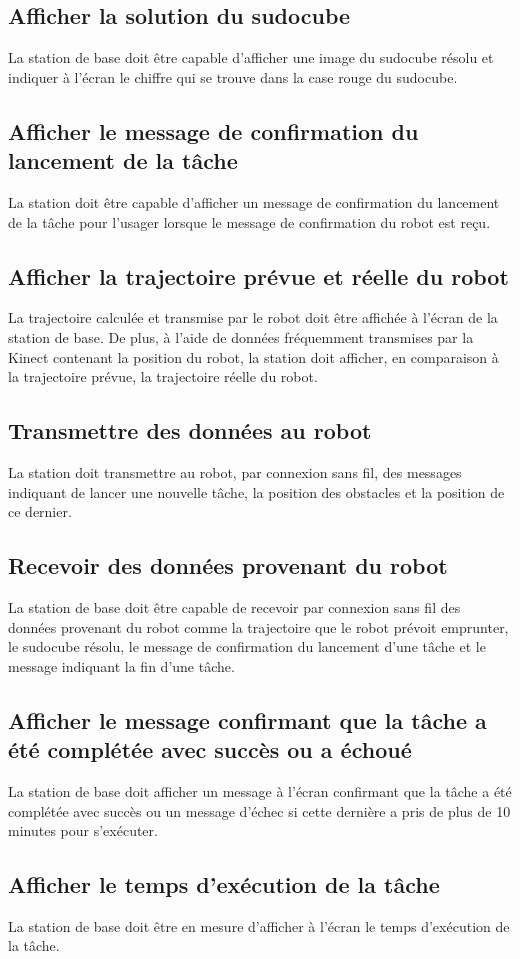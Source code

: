 \subsection{Afficher la solution du sudocube}
La station de base doit être capable d'afficher une image du sudocube résolu et indiquer à l'écran le chiffre qui se trouve dans la case rouge du sudocube.
\subsection{Afficher le message de confirmation du lancement de la tâche}
La station doit être capable d'afficher un message de confirmation du lancement de la tâche pour l'usager lorsque le message de confirmation du robot est reçu.
\subsection{Afficher la trajectoire prévue et réelle du robot}
La trajectoire calculée et transmise par le robot doit être affichée à l'écran de la station de base. De plus, à l'aide de données fréquemment transmises par la Kinect contenant la position du robot, la station doit afficher, en comparaison à la trajectoire prévue, la trajectoire réelle du robot.
\subsection{Transmettre des données au robot}
La station doit transmettre au robot, par connexion sans fil, des messages indiquant de lancer une nouvelle tâche, la position des obstacles et la position de ce dernier.
\subsection{Recevoir des données provenant du robot}
La station de base doit être capable de recevoir par connexion sans fil des données provenant du robot comme la trajectoire que le robot prévoit emprunter, le sudocube résolu, le message de confirmation du lancement d'une tâche et le message indiquant la fin d'une tâche.
\subsection{Afficher le message confirmant que la tâche a été complétée avec succès ou a échoué}
La station de base doit afficher un message à l'écran confirmant que la tâche a été complétée avec succès ou un message d'échec si cette dernière a pris de plus de 10 minutes pour s'exécuter.
\subsection{Afficher le temps d'exécution de la tâche}
La station de base doit être en mesure d'afficher à l'écran le temps d'exécution de la tâche.
